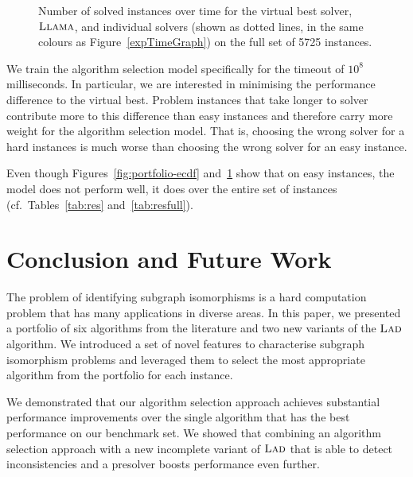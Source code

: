 \documentclass{llncs}
\newcommand{\LAD}{$\textsc{Lad}$\xspace}
\newcommand{\LLAMA}{$\textsc{Llama}$\xspace}
\begin{document}
\begin{figure}[p]
    
\caption{Number of solved instances over time for the virtual best
solver, \LLAMA, and individual solvers (shown as dotted lines, in the same
colours as Figure~\ref{expTimeGraph}) on the full set of 5725 instances.}
\label{fig:portfolio-ecdf-full}
\end{figure}

We train the algorithm selection model specifically for the timeout of $10^8$
milliseconds. In particular, we are interested in minimising the performance
difference to the virtual best. Problem instances that take longer to solver
contribute more to this difference than easy instances and therefore carry more
weight for the algorithm selection model. That is, choosing the wrong solver for
a hard instances is much worse than choosing the wrong solver for an easy
instance.

Even though Figures~\ref{fig:portfolio-ecdf} and~\ref{fig:portfolio-ecdf-full}
show that on easy instances, the model does not perform well, it does over
the entire set of instances (cf.\ Tables~\ref{tab:res} and~\ref{tab:resfull}).

\section{Conclusion and Future Work}\label{sec:concs}

The problem of identifying subgraph isomorphisms is a hard computation problem that has many
applications in diverse areas. In this paper, we presented a portfolio of six algorithms from the
literature and two new variants of the \LAD algorithm. We introduced a set of novel features to
characterise subgraph isomorphism problems and leveraged them to select the most appropriate
algorithm from the portfolio for each instance.

We demonstrated that our algorithm selection approach achieves substantial
performance improvements over the single algorithm that has the best performance
on our benchmark set. We showed that combining an algorithm selection approach
with a new incomplete variant of \LAD that is able to detect inconsistencies
and a presolver boosts performance even further.



\end{document}
